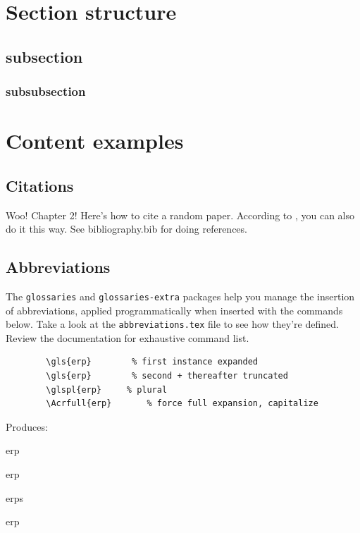 \documentclass[../../main.tex]{subfiles}  %
\begin{document}
\section{Section structure}

	\subsection{subsection}

	\subsubsection{subsubsection}

\section{Content examples}

	\subsection{Citations}

	Woo! 
	Chapter 2!
	Here's how to cite a random paper\supercite{aartsSolutionDependencyUsing2014}. 
	According to \citeauthor{aartsSolutionDependencyUsing2014} \citeyear{aartsSolutionDependencyUsing2014}, you can also do it this way.
	See bibliography.bib for doing references.

	\subsection{Abbreviations}

	The \verb|glossaries| and \verb|glossaries-extra| packages help you manage the insertion of abbreviations, applied programmatically when inserted with the commands below. 
	Take a look at the \verb|abbreviations.tex| file to see how they're defined.
	Review the documentation for exhaustive command list.

	\begin{verbatim}
		\gls{erp}		 % first instance expanded
		\gls{erp}		 % second + thereafter truncated
		\glspl{erp}		% plural
		\Acrfull{erp}		% force full expansion, capitalize
	\end{verbatim}

	Produces: 
	\begin{enumerate*}[label=(\roman*), itemjoin={{, }}, itemjoin={{, }}, itemjoin*={{, and }}]
	\item \gls{erp}
	\item \gls{erp}
	\item \glspl{erp}
	\item \Acrfull{erp}
	\end{enumerate*}
\end{document}
